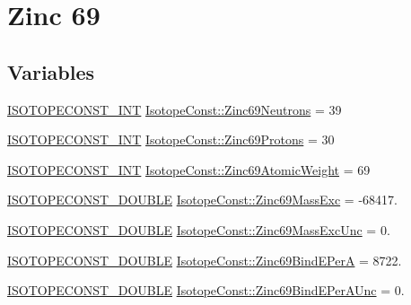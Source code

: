 \hypertarget{group___isotope_const-_zinc-_zn69}{}\section{Zinc 69}
\label{group___isotope_const-_zinc-_zn69}
\subsection*{Variables}
\begin{DoxyCompactItemize}
\item 
\mbox{\hyperlink{group___isotope_const-_macros_ga5f18360b3e99483a35c32d789e62621c}{I\+S\+O\+T\+O\+P\+E\+C\+O\+N\+S\+T\+\_\+\+I\+NT}} \mbox{\hyperlink{group___isotope_const-_zinc-_zn69_gabe0135b0b08cf3c46c0b88d3bc687e3c}{Isotope\+Const\+::\+Zinc69\+Neutrons}} = 39
\item 
\mbox{\hyperlink{group___isotope_const-_macros_ga5f18360b3e99483a35c32d789e62621c}{I\+S\+O\+T\+O\+P\+E\+C\+O\+N\+S\+T\+\_\+\+I\+NT}} \mbox{\hyperlink{group___isotope_const-_zinc-_zn69_ga07bf9a87f4a5e048b411bdb669029353}{Isotope\+Const\+::\+Zinc69\+Protons}} = 30
\item 
\mbox{\hyperlink{group___isotope_const-_macros_ga5f18360b3e99483a35c32d789e62621c}{I\+S\+O\+T\+O\+P\+E\+C\+O\+N\+S\+T\+\_\+\+I\+NT}} \mbox{\hyperlink{group___isotope_const-_zinc-_zn69_ga2e53b82c9bf4c89fd1a258ec42f9cd38}{Isotope\+Const\+::\+Zinc69\+Atomic\+Weight}} = 69
\item 
\mbox{\hyperlink{group___isotope_const-_macros_ga8f45a7272ce02c0b4c65c44636ed719a}{I\+S\+O\+T\+O\+P\+E\+C\+O\+N\+S\+T\+\_\+\+D\+O\+U\+B\+LE}} \mbox{\hyperlink{group___isotope_const-_zinc-_zn69_ga0ae9b01e6e2293f0242c58c68faedaa6}{Isotope\+Const\+::\+Zinc69\+Mass\+Exc}} = -\/68417.
\item 
\mbox{\hyperlink{group___isotope_const-_macros_ga8f45a7272ce02c0b4c65c44636ed719a}{I\+S\+O\+T\+O\+P\+E\+C\+O\+N\+S\+T\+\_\+\+D\+O\+U\+B\+LE}} \mbox{\hyperlink{group___isotope_const-_zinc-_zn69_ga9a9d50701162b04404b026370a04463c}{Isotope\+Const\+::\+Zinc69\+Mass\+Exc\+Unc}} = 0.
\item 
\mbox{\hyperlink{group___isotope_const-_macros_ga8f45a7272ce02c0b4c65c44636ed719a}{I\+S\+O\+T\+O\+P\+E\+C\+O\+N\+S\+T\+\_\+\+D\+O\+U\+B\+LE}} \mbox{\hyperlink{group___isotope_const-_zinc-_zn69_ga139ac217dd76902ac8c2ef0a0d50375b}{Isotope\+Const\+::\+Zinc69\+Bind\+E\+PerA}} = 8722.
\item 
\mbox{\hyperlink{group___isotope_const-_macros_ga8f45a7272ce02c0b4c65c44636ed719a}{I\+S\+O\+T\+O\+P\+E\+C\+O\+N\+S\+T\+\_\+\+D\+O\+U\+B\+LE}} \mbox{\hyperlink{group___isotope_const-_zinc-_zn69_ga2625bf8d3e0cf9d022e7da1802f695f1}{Isotope\+Const\+::\+Zinc69\+Bind\+E\+Per\+A\+Unc}} = 0.

\end{DoxyCompactItemize}
